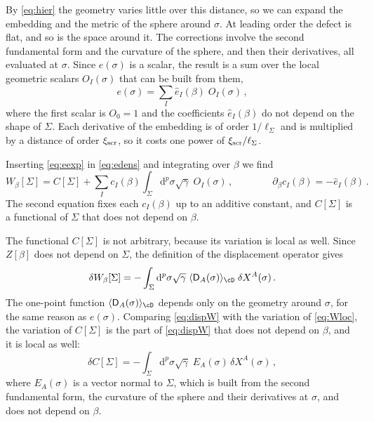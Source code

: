 \documentclass[a4paper,11pt]{article}
\newcommand{\xiscr}{\xi_{\rm scr}}
\newcommand{\dd}{\mathrm{d}}
\newcommand{\sD}{\mathsf{D}}%
\begin{document}
	By \eqref{eq:hier} the geometry varies little over this distance, so we can expand the embedding and the metric of the sphere around $\sigma$. At leading order the defect is flat, and so is the space around it. The corrections involve the second fundamental form and the curvature of the sphere, and then their derivatives, all evaluated at $\sigma$. Since $e(\sigma)$ is a scalar, the result is a sum over the local geometric scalars $O_I(\sigma)$ that can be built from them,
	\begin{equation}\label{eq:eexp}
		e(\sigma)=\sum_I\hat e_I(\beta)\;O_I(\sigma)\, ,
	\end{equation}
	where the first scalar is $O_0=1$ and the coefficients $\hat e_I(\beta)$ do not depend on the shape of $\Sigma$. Each derivative of the embedding is of order $1/\ell_\Sigma$ and is multiplied by a distance of order $\xiscr$, so it costs one power of $\xiscr/\ell_\Sigma$.
	
	Inserting \eqref{eq:eexp} in \eqref{eq:edens} and integrating over $\beta$ we find
	\begin{equation}\label{eq:Wloc}
		W_\beta[\Sigma]=C[\Sigma]+\sum_I c_I(\beta)\int_\Sigma\dd^p\sigma\sqrt\gamma\;O_I(\sigma)\, ,\qquad\qquad \partial_\beta c_I(\beta)=-\hat e_I(\beta)\, .
	\end{equation}
	The second equation fixes each $c_I(\beta)$ up to an additive constant, and $C[\Sigma]$ is a functional of $\Sigma$ that does not depend on $\beta$.
	
The functional $C[\Sigma]$ is not arbitrary, because its variation is local as well. Since $Z[\beta]$ does not depend on $\Sigma$, the definition of the displacement operator gives
	\begin{equation}\label{eq:dispW}
		\delta W_\beta[\Sigma]=-\int_\Sigma\dd^p\sigma\sqrt\gamma\;\langle \sD_A(\sigma)\rangle_{\cD}\;\delta X^A(\sigma)\, .
	\end{equation}
	The one-point function $\langle\sD_A(\sigma)\rangle_{\cD}$ depends only on the geometry around $\sigma$, for the same reason as $e(\sigma)$. Comparing \eqref{eq:dispW} with the variation of \eqref{eq:Wloc}, the variation of $C[\Sigma]$ is the part of \eqref{eq:dispW} that does not depend on $\beta$, and it is local as well:
	\begin{equation}\label{eq:deltaC}
		\delta C[\Sigma]=-\int_\Sigma\dd^p\sigma\sqrt\gamma\;E_A(\sigma)\,\delta X^A(\sigma)\, ,
	\end{equation}
	where $E_A(\sigma)$ is a vector normal to $\Sigma$, which is built from the second fundamental form, the curvature of the sphere and their derivatives at $\sigma$, and does not depend on $\beta$. 
\end{document}

